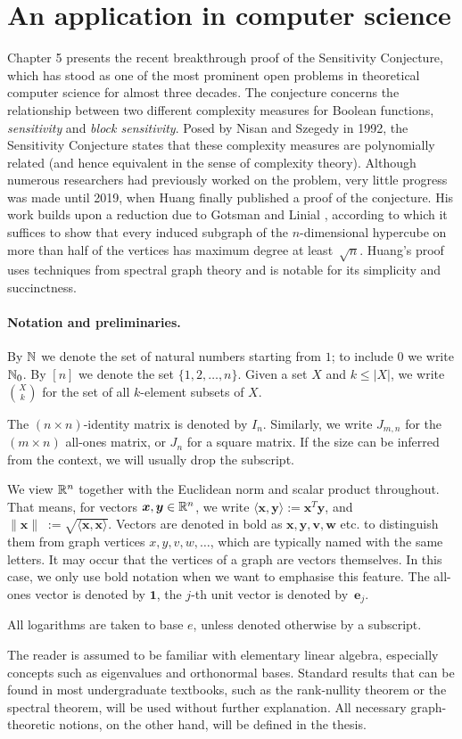 \section{An application in computer science}
Chapter 5 presents the recent breakthrough proof of the Sensitivity Conjecture, which has stood as one of the most prominent open problems in theoretical computer science for almost three decades.
The conjecture concerns the relationship between two different complexity measures for Boolean functions, \textit{sensitivity} and \textit{block sensitivity}. 
Posed by Nisan and Szegedy \cite{nisanszegedy} in 1992, the Sensitivity Conjecture states that these complexity measures are polynomially related (and hence equivalent in the sense of complexity theory).
Although numerous researchers had previously worked on the problem, very little progress was made until 2019, when Huang \cite{sensitivity} finally published a proof of the conjecture. 
His work builds upon a reduction due to Gotsman and Linial \cite{gotsmanlinial}, according to which it suffices to show that every induced subgraph of the $n$-dimensional hypercube on more than half of the vertices has maximum degree at \mbox{least $\sqrt{n}$}.
Huang's proof uses techniques from spectral graph theory and is notable for its simplicity and succinctness.

\paragraph{Notation and preliminaries.}
By $\mathbb{N}$ we denote the set of natural numbers starting from $1$; to include 0 we write $\mathbb{N}_0$. 
By $[n]$ we denote the set $\{1, 2, \dots, n\}$. 
Given a set $X$ and $k \le |X|$, we write $\binom{X}{k}$ for the set of all $k$-element subsets of $X$.

The $(n \times n)$-identity matrix is denoted by $I_n$. 
Similarly, we write $J_{m,n}$ for the $(m \times n)$ all-ones matrix, or $J_n$ for a square matrix.
If the size can be inferred from the context, we will usually drop the subscript.

We view $\mathbb{R}^n$ together with the Euclidean norm and scalar product throughout.
That means, for vectors $\bm{x}, \bm{y} \in \mathbb{R}^n$, we write $\langle \bm{x}, \bm{y} \rangle := \bm{x}^T \bm{y}$, and $\| \bm{x} \|\; := \sqrt{\langle \bm{x}, \bm{x} \rangle}$.
Vectors are denoted in bold as $\bm{x}, \bm{y}, \bm{v}, \bm{w}$ etc. to distinguish them from graph vertices $x, y, v, w, \dots$, which are typically named with the same letters.
It may occur that the vertices of a graph are vectors themselves.
In this case, we only use bold notation when we want to emphasise this feature.
The all-ones vector is denoted by $\bm{1}$, the $j$-th unit vector is denoted \mbox{by $\bm{e}_j$}.

All logarithms are taken to base $e$, unless denoted otherwise by a subscript.

The reader is assumed to be familiar with elementary linear algebra, especially concepts such as eigenvalues and orthonormal bases.
Standard results that can be found in most undergraduate textbooks, such as the rank-nullity theorem or the spectral theorem, will be used without further explanation. 
All necessary graph-theoretic notions, on the other hand, will be defined in the thesis.
